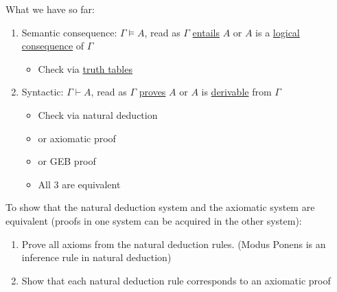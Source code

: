 \documentclass[11pt]{article}
\begin{document}
What we have so far: 
\begin{enumerate}
\item Semantic consequence: \(\Gamma \models A\), read as \(\Gamma\) \uline{entails} \(A\) or \(A\) is a \uline{logical consequence} of \(\Gamma\)  
\begin{itemize}
\item Check via \uline{truth tables}
\end{itemize}
\item Syntactic: \(\Gamma \vdash A\), read as \(\Gamma\) \uline{proves} \(A\) or \(A\) is \uline{derivable} from \(\Gamma\)
\begin{itemize}
\item Check via natural deduction
\item or axiomatic proof
\item or GEB proof
\item All 3 are equivalent
\end{itemize}
\end{enumerate}

To show that the natural deduction system and the axiomatic system are equivalent (proofs in one system can be acquired in the other system):
\begin{enumerate}
\item Prove all axioms from the natural deduction rules. (Modus Ponens is an inference rule in natural deduction)
\item Show that each natural deduction rule corresponds to an axiomatic proof
\end{enumerate}
\end{document}
